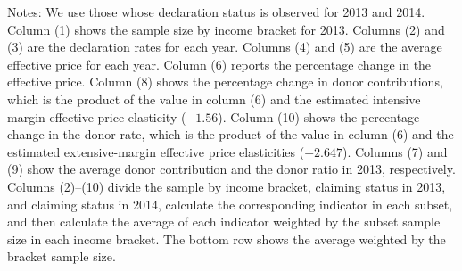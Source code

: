 \begin{table}
\begin{threeparttable}
\begin{tablenotes}
\item Notes: We use those whose declaration status is observed for 2013 and 2014. Column (1) shows the sample size by income bracket for 2013. Columns (2) and (3) are the declaration rates for each year. Columns (4) and (5) are the average effective price for each year. Column (6) reports the percentage change in the effective price. Column (8) shows the percentage change in donor contributions, which is the product of the value in column (6) and the estimated intensive margin effective price elasticity ($-1.56$). Column (10) shows the percentage change in the donor rate, which is the product of the value in column (6) and the estimated extensive-margin effective price elasticities ($-2.647$). Columns (7) and (9) show the average donor contribution and the donor ratio in 2013, respectively. Columns (2)--(10) divide the sample by income bracket, claiming status in 2013, and claiming status in 2014, calculate the corresponding indicator in each subset, and then calculate the average of each indicator weighted by the subset sample size in each income bracket. The bottom row shows the average weighted by the bracket sample size.
\end{tablenotes}
\end{threeparttable}
\end{table}
